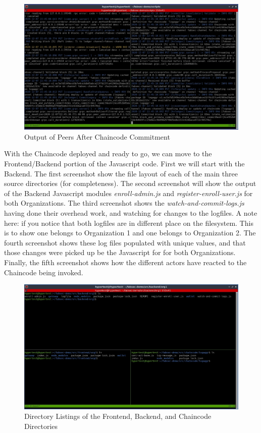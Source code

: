 		\begin{figure}[H]
		\includegraphics[width=.9\textwidth]{./fabsec-report-network-flow/network-flow-14.jpg}
		\centering
		\caption{Output of Peers After Chaincode Commitment}
		\end{figure}
		
	\newpage
	\hspace{10mm}With the Chaincode deployed and ready to go, we can move to the Frontend/Backend portion of the Javascript code. First we will start with the Backend. The first screenshot show the file layout of each of the main three source directories (for completeness). The second screenshot will show the output of the Backend Javascript modules \textit{enroll-admin.js} and \textit{register-enroll-user.js} for both Organizations.  The third screenshot shows the \textit{watch-and-commit-logs.js} having done their overhead work, and watching for changes to the logfiles. A note here: if you notice that both logfiles are in different place on the filesystem. This is to show one belongs to Organization 1 and one belongs to Organization 2. The fourth screenshot shows these log files populated with unique values, and that those changes were picked up be the Javascript for for both Organizations. Finally, the fifth screenshot shows how the different actors have reacted to the Chaincode being invoked.
	
		\begin{figure}[H]
		\includegraphics[width=\textwidth]{./fabsec-report-network-flow/network-flow-15.jpg}
		\caption{Directory Listings of the Frontend, Backend, and Chaincode Directories}
		\end{figure}

